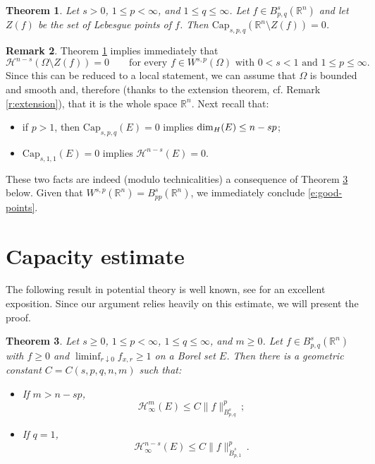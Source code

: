\documentclass[11pt,reqno]{amsart}
\newcommand{\R}{\mathbb R}
\newcommand{\Capa}{\textrm{Cap}}
\renewcommand{\H}{\mathcal{H}}
\newtheorem{theorem}{Theorem}[section]
\theoremstyle{definition}
\newtheorem{remark}[theorem]{Remark}
\numberwithin{equation}{section}
\begin{document}
\begin{theorem}\label{t:capacity}
Let $s>0$, $1\le p<\infty$, and $1\le q\le \infty$. Let $f\in B^s_{p,q}(\R^n)$ and let $Z(f)$ be the set of Lebesgue points of $f$.
Then $\Capa_{s,p,q} (\R^n\setminus Z(f)) = 0$. 
\end{theorem}


\begin{remark}\label{r:capacity-Hausdorff}
Theorem \ref{t:capacity} implies immediately that 
\begin{equation}\label{e:good-points}
\mathcal{H}^{n-s} (\Omega \setminus Z(f)) =0 \qquad \mbox{for every $f\in W^{s,p} (\Omega)$ with $0<s<1$ and $1\leq p \leq \infty$}.
\end{equation}
Since this can be reduced to a local statement, we can assume that $\Omega$ is bounded and smooth and, therefore (thanks to the extension theorem, cf. Remark \ref{r:extension}), that it is the whole space $\mathbb R^n$. Next recall that:
\begin{itemize}
\item if $p>1$, then $\Capa_{s,p,q} (E) =0$ implies ${\rm dim}_H (E) \leq n -sp$;
\item $\Capa_{s,1,1} (E) =0$ implies $\mathcal{H}^{n-s} (E) =0$.
\end{itemize}
These two facts are indeed (modulo technicalities) a consequence of Theorem \ref{t:capacity-estimate} below.
Given that $W^{s,p} (\mathbb R^n) = B^s_{pp} (\mathbb R^n)$, we immediately conclude \eqref{e:good-points}.
\end{remark}

\section{Capacity estimate}

The following result in potential theory is well known, see \cite{Ada89} for an excellent exposition. Since our argument relies heavily on this estimate, we will present the proof. 

\begin{theorem}\label{t:capacity-estimate}
Let $s\ge0$, $1\le p<\infty$, $1\le q \le \infty$, and $m\ge 0$. Let $f\in B^{s}_{p,q}(\R^n)$ with $f\ge0$ and $\liminf_{r\downarrow0}f_{x,r}\ge 1$ on a Borel set $E$. Then there is a geometric constant $C=C(s,p,q,n,m)$ such that:
\begin{itemize}
\item[(a)] If $m>n-sp$,
\begin{equation}\label{e:capacity-estimate-1}
\H^m_\infty(E)\le C\|f\|^p_{B^s_{p,q}}\, ;
\end{equation}
\item[(b)] If $q=1$,
\begin{equation}\label{e:capacity-estimate-2}
\H^{n-s}_{\infty}(E)\le C\|f\|^p_{\dot{B}^s_{p,1}}\, .
\end{equation}
\end{itemize}
\end{theorem}
\end{document}
